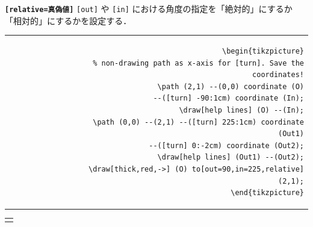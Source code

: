 \documentclass[lualatex]{jlreq}
\begin{document}
\textbf{\texttt{[relative=真偽値]}} \verb|[out]| や \verb|[in]| における角度の指定を「絶対的」にするか「相対的」にするかを設定する．
\\[0.5em]
\begin{minipage}{0.66 \textwidth}
    \begin{flushright}
        \begin{tabular}{r}
            \begin{lstlisting}[language={[LaTeX] TeX},
            numbers=none,breaklines=true,gobble=12,frame=none]
            \begin{tikzpicture}
                % non-drawing path as x-axis for [turn]. Save the coordinates!
                \path (2,1) --(0,0) coordinate (O)
                    --([turn] -90:1cm) coordinate (In);
                \draw[help lines] (O) --(In);
                \path (0,0) --(2,1) --([turn] 225:1cm) coordinate (Out1)
                    --([turn] 0:-2cm) coordinate (Out2);
                \draw[help lines] (Out1) --(Out2);
                \draw[thick,red,->] (O) to[out=90,in=225,relative](2,1);
            \end{tikzpicture}
            \end{lstlisting}
        \end{tabular}
    \end{flushright}
\end{minipage}
\hfill
\begin{minipage}{0.32 \textwidth}
    \begin{flushleft}
        \begin{tabular}{l}
            \begin{tikzpicture}
                \path (2,1) --(0,0) coordinate (O) --([turn] -90:1cm) coordinate (In);
                \draw[help lines] (O) --(In);
                \path (0,0) --(2,1) --([turn] 225:1cm) coordinate (Out1) --([turn] 0:-2cm) coordinate (Out2);
                \draw[help lines] (Out1) --(Out2);
                \draw[thick,red,->] (O) to[out=90,in=225,relative](2,1);
            \end{tikzpicture}
        \end{tabular}
    \end{flushleft}
\end{minipage}
\\[1em]
\end{document}
